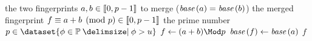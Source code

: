 \begin{algorithmic}[1]
  \In the two fingerprints \( a, b \in \llbracket0, p - 1\rrbracket \) to merge (\( \base (a) = \base (b) \))
  \Out the merged fingerprint \( f \equiv a + b \pmod{p} \in \llbracket0, p - 1\rrbracket \)
  \Constant the prime number \( p \in \dataset{\phi \in \primes \suchthat \phi > u} \)
    \State \( f \gets (a + b) \Mod p \)
    \State \( \base (f) \gets \base (a) \)
    \State \Return \( f \)
  \EndFunction
\end{algorithmic}
